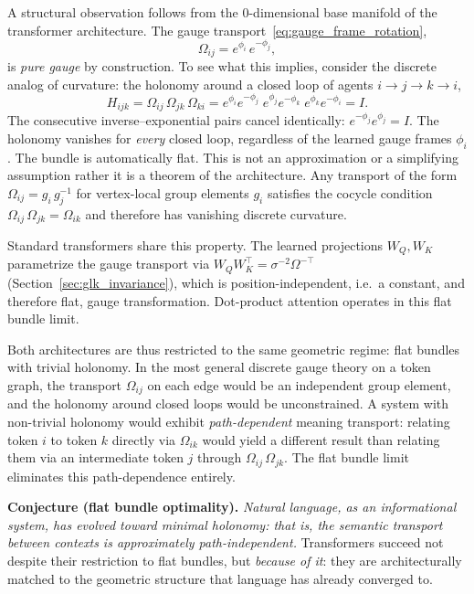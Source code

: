 \documentclass[twoside,11pt]{article}
\begin{document}
A structural observation follows from the 0-dimensional base manifold of the transformer architecture. The gauge transport~\eqref{eq:gauge_frame_rotation},
\begin{equation}
\Omega_{ij} = e^{\phi_i}\,e^{-\phi_j},
\end{equation}
is \emph{pure gauge} by construction. To see what this implies, consider the discrete analog of curvature: the holonomy around a closed loop of agents $i \to j \to k \to i$,
\begin{equation}
H_{ijk} = \Omega_{ij}\,\Omega_{jk}\,\Omega_{ki}
= e^{\phi_i}e^{-\phi_j}\;e^{\phi_j}e^{-\phi_k}\;e^{\phi_k}e^{-\phi_i}
= I.
\label{eq:holonomy}
\end{equation}
The consecutive inverse--exponential pairs cancel identically: $e^{-\phi_j}e^{\phi_j} = I$. The holonomy vanishes for \emph{every} closed loop, regardless of the learned gauge frames $\phi_i$. The bundle is automatically flat. This is not an approximation or a simplifying assumption rather it is a theorem of the architecture. Any transport of the form $\Omega_{ij} = g_i\,g_j^{-1}$ for vertex-local group elements $g_i$ satisfies the cocycle condition $\Omega_{ij}\,\Omega_{jk} = \Omega_{ik}$ and therefore has vanishing discrete curvature.

Standard transformers share this property. The learned projections $W_Q, W_K$ parametrize the gauge transport via $W_Q W_K^\top = \sigma^{-2}\Omega^{-\top}$ (Section~\ref{sec:glk_invariance}), which is position-independent, i.e.\ a constant, and therefore flat, gauge transformation. Dot-product attention operates in this flat bundle limit.

Both architectures are thus restricted to the same geometric regime: flat bundles with trivial holonomy. In the most general discrete gauge theory on a token graph, the transport $\Omega_{ij}$ on each edge would be an independent group element, and the holonomy around closed loops would be unconstrained. A system with non-trivial holonomy would exhibit \emph{path-dependent} meaning transport: relating token $i$ to token $k$ directly via $\Omega_{ik}$ would yield a different result than relating them via an intermediate token $j$ through $\Omega_{ij}\,\Omega_{jk}$. The flat bundle limit eliminates this path-dependence entirely.

\textbf{Conjecture (flat bundle optimality).} \emph{Natural language, as an informational system, has evolved toward minimal holonomy: that is, the semantic transport between contexts is approximately path-independent.} Transformers succeed not despite their restriction to flat bundles, but \emph{because of it}: they are architecturally matched to the geometric structure that language has already converged to.
\end{document}
